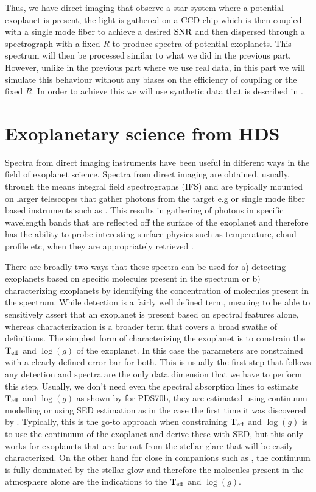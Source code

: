 Thus, we have direct imaging that observe a star system where a potential exoplanet is present, the light is gathered on a CCD chip which is then coupled with a single mode fiber to achieve a desired $\rm{SNR}$ and then dispersed through a spectrograph with a fixed $R$ to produce spectra of potential exoplanets.
This spectrum will then be processed similar to what we did in the previous part.
However, unlike in the previous part where we use real data, in this part we will simulate this behaviour without any biases on the efficiency of coupling or the fixed $R$.
In order to achieve this we will use synthetic data that is described in .




\section{Exoplanetary science from HDS}
Spectra from direct imaging instruments have been useful in different ways in the field of exoplanet science. 
Spectra from direct imaging are obtained, usually, through the means integral field spectrographs (IFS) and are typically mounted on larger telescopes that gather photons from the target e.g \citep[e.g][]{2004SINFONI,2019SPHERE} or single mode fiber based instruments such as \citep[e.g][]{2019KPIC}.
This results in gathering of photons in specific wavelength bands that are reflected off the surface of the exoplanet and therefore has the ability to probe interesting surface physics such as temperature, cloud profile etc, when they are appropriately retrieved \citep[e.g][]{2019PICASO}.

There are broadly two ways that these spectra can be used for a) detecting exoplanets based on specific molecules present in the spectrum or b) characterizing exoplanets by identifying the concentration of molecules present in the spectrum.
While detection is a fairly well defined term, meaning to be able to sensitively assert that an exoplanet is present based on spectral features alone, whereas characterization is a broader term that covers a broad swathe of definitions.
The simplest form of characterizing the exoplanet is to constrain the $\rm{T_{eff}}$ and $\log(g)$ of the exoplanet.
In this case the parameters are constrained with a clearly defined error bar for both.
This is usually the first step that follows any detection and spectra are the only data dimension that we have to perform this step.
Usually, we don't need even the spectral absorption lines to estimate $\rm{T_{eff}}$ and $\log(g)$ as shown by \citep[e.g][]{2023Cugno} for PDS70b, they are estimated using continuum modelling or using SED estimation as in the case the first time it was discovered by \cite{2019MesaPDS70}.
Typically, this is the go-to approach when constraining $\rm{T_{eff}}$ and $\log(g)$ is to use the continuum of the exoplanet and derive these with SED, but this only works for exoplanets that are far out from the stellar glare that will be easily characterized.
On the other hand for close in companions such as \citep[HD142527b, ][]{2018A&ChristiaensHD142527}, the continuum is fully dominated by the stellar glow and therefore the molecules present in the atmosphere alone are the indications to the $\rm{T_{eff}}$ and $\log(g)$.

